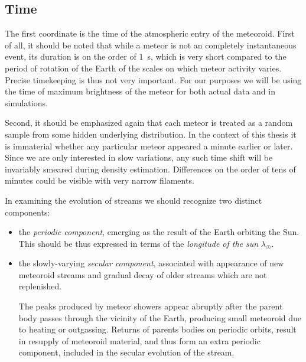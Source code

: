             

    \subsection{Time} \label{mst}
        The first coordinate is the time of the atmospheric entry of the meteoroid.
        First of all, it should be noted that while a meteor is not an completely instantaneous event,
        its duration is on the order of \SI{1}{\second}, which is very short compared to the
        period of rotation of the Earth of the scales on which meteor activity varies.
        Precise timekeeping is thus not very important.
        For our purposes we will be using the time of maximum brightness
        of the meteor for both actual data and in simulations.

        Second, it should be emphasized again that each meteor is treated
        as a random sample from some hidden underlying distribution.
        In the context of this thesis it is immaterial whether any particular meteor
        appeared a minute earlier or later. Since we are only interested in slow variations,
        any such time shift will be invariably smeared during density estimation.
        Differences on the order of tens of minutes could be visible with very narrow filaments.

        In examining the evolution of streams we should recognize two distinct components:
        \begin{itemize}
            \item the \emph{periodic component}, emerging as the result of the Earth orbiting the Sun.
                This should be thus expressed in terms of the \emph{longitude of the sun} $\lambda_\Sun$.

            \item the slowly-varying \emph{secular component}, associated with appearance of new meteoroid
                streams and gradual decay of older streams which are not replenished.

                The peaks produced by meteor showers appear abruptly after the parent body passes through the vicinity of the Earth,
                producing small meteoroid due to heating or outgassing.
                Returns of parents bodies on periodic orbits, result in resupply of meteoroid material,
                and thus form an extra periodic component, included in the secular evolution of the stream.
        \end{itemize}

